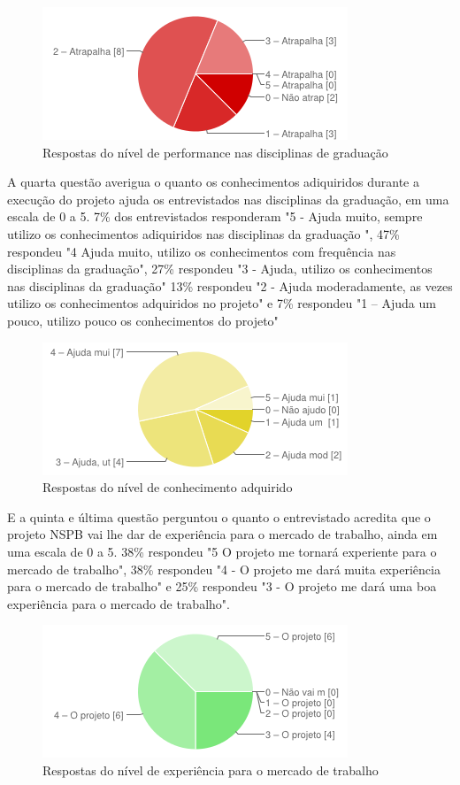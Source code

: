 \begin{figure}[htpb]
  \begin{center}
    \includegraphics[width=.37\textwidth]{images/chart2.png}
  \end{center}
  \caption{Respostas do nível de performance nas disciplinas de graduação}
  \label{fig:core_concurrent}
\end{figure} 

A quarta questão averigua o quanto os conhecimentos adiquiridos durante a execução do projeto ajuda os entrevistados nas disciplinas da graduação, em uma escala de 0 a 5. 7\% dos entrevistados responderam "5 - Ajuda muito, sempre utilizo os conhecimentos adiquiridos nas disciplinas da graduação	", 47\% respondeu "4  Ajuda muito, utilizo os conhecimentos com frequência nas disciplinas da graduação", 27\% respondeu "3 - Ajuda, utilizo os conhecimentos nas disciplinas da graduação" 13\% respondeu "2 - Ajuda moderadamente, as vezes utilizo os conhecimentos adquiridos no projeto" e 7\% respondeu "1 – Ajuda um pouco, utilizo pouco os conhecimentos do projeto"

\begin{figure}[htpb]
  \begin{center}
    \includegraphics[width=.37\textwidth]{images/chart3.png}
  \end{center}
  \caption{Respostas do nível de conhecimento adquirido}
  \label{fig:core_concurrent}
\end{figure} 

E a quinta e última questão perguntou o quanto o entrevistado acredita que o projeto NSPB vai lhe dar de experiência para o mercado de trabalho, ainda em uma escala de 0 a 5. 38\% respondeu "5  O projeto me tornará experiente para o mercado de trabalho", 38\% respondeu "4 - O projeto me dará muita experiência para o mercado de trabalho" e 25\% respondeu "3 - O projeto me dará uma boa experiência para o mercado de trabalho".

\begin{figure}[htpb]
  \begin{center}
    \includegraphics[width=.37\textwidth]{images/chart4.png}
  \end{center}
  \caption{Respostas do nível de experiência para o mercado de trabalho}
  \label{fig:core_concurrent}
\end{figure} 